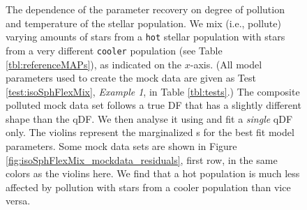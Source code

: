 \begin{figure}[!htbp]
\caption{The dependence of the parameter recovery on degree of pollution and temperature of the stellar population. We mix (i.e., pollute) varying amounts of stars from a \texttt{hot} stellar population with stars from a very different \texttt{cooler} population (see Table \ref{tbl:referenceMAPs}), as indicated on the $x$-axis. (All model parameters used to create the mock data are given as Test \ref{test:isoSphFlexMix}, \emph{Example 1}, in Table \ref{tbl:tests}.) The composite polluted mock data set follows a true DF that has a slightly different shape than the qDF. We then analyse it using \RM{} and fit a \emph{single} qDF only. The violins represent the marginalized \pdf{}s for the best fit model parameters.  Some mock data sets are shown in Figure \ref{fig:isoSphFlexMix_mockdata_residuals}, first row, in the same colors as the violins here.  We find that a hot population is much less affected by pollution with stars from a cooler population than vice versa. }
\label{fig:isoSphFlexMixCont}
\end{figure}




